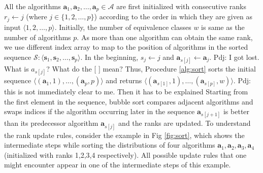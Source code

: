 \documentclass[conference]{IEEEtran}
\newcommand{\p}[1]{{\color{blue} Pdj: #1}}
\begin{document}
All the algorithms $\mathbf{a}_1, \mathbf{a}_2, \dots, \mathbf{a}_p \in \mathcal{A}$ are first initialized with consecutive
ranks $r_j \leftarrow j$ (where $j \in\{1,2,\dots,p\}$) according to the order in which they are given as input $\langle 1,2,\dots,p \rangle
$.
Initially, the number of equivalence classes $w$ is same as the number of algorithms $p$. As more than one algorithm
can obtain the same rank, we use different index array to map to the position of algorithms in the sorted sequence
$\mathcal{S} : \langle \mathbf{s}_1, \mathbf{s}_2, \dots, \mathbf{s}_p \rangle$. In the beginning, $s_j \leftarrow j$ and $
\mathbf{a}_{s[j]} \leftarrow \mathbf{a}_j$.
\p{I got lost. What is ${a}_{s[j]}$? What do the [ ] mean?} 
Thus, Procedure \ref{alg:sort} sorts the initial sequence $\langle (\mathbf{a}_1,1), \dots, (\mathbf{a}_p,p) \rangle$ and returns $\langle (\mathbf{a}_{s[1]},1), \dots, (\mathbf{a}_{s[p]},w) \rangle$.
\p{this is not immediately clear to me. Then it has to be explained}
 Starting from the first element in the sequence,  bubble sort\cite{bubblesort} compares adjacent algorithms and swaps
 indices if the algorithm occurring later in the sequence $\mathbf{a}_{s[j+1]}$ is better than its predecessor algorithm
 $\mathbf{a}_{s[j]}$ and the ranks are updated. To understand the rank update rules, consider the example in Fig
 \ref{fig:sort}, which shows the intermediate steps while sorting the distributions of four algorithms $\mathbf{a}_1,
 \mathbf{a}_2, \mathbf{a}_3,\mathbf{a}_4$ (initialized with ranks 1,2,3,4 respectively). All possible update rules that
 one might encounter appear in one of the intermediate steps of this example.
\end{document}
